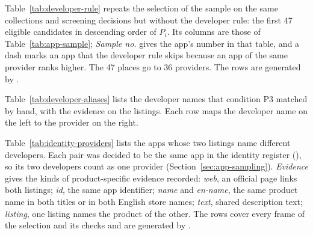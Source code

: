 Table~\ref{tab:developer-rule} repeats the selection of the sample on the same
collections and screening decisions but without the developer rule: the first
47 eligible candidates in descending order of $P_i$. Its columns are those of
Table~\ref{tab:app-sample}; \emph{Sample no.} gives the app's number in that
table, and a dash marks an app that the developer rule skips because an app of
the same provider ranks higher. The 47 places go to 36 providers. The rows are
generated by .

Table~\ref{tab:developer-aliases} lists the developer names that condition P3
matched by hand, with the evidence on the listings. Each row maps the developer
name on the left to the provider on the right.

Table~\ref{tab:identity-providers} lists the apps whose two listings name
different developers. Each pair was decided to be the same app in the identity
register (), so its two developers count
as one provider (Section~\ref{sec:app-sampling}). \emph{Evidence} gives the
kinds of product-specific evidence recorded: \emph{web}, an official page links
both listings; \emph{id}, the same app identifier; \emph{name} and
\emph{en-name}, the same product name in both titles or in both English store
names; \emph{text}, shared description text; \emph{listing}, one listing names
the product of the other. The rows cover every frame of the selection and its
checks and are generated by .

